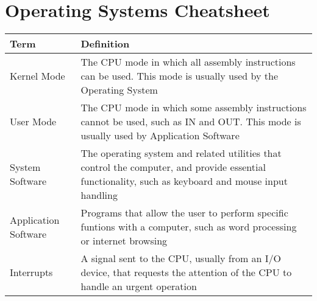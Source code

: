 \chapter{Operating Systems Cheatsheet}

\begin{center}
  \begin{tabular}{ |p{}|p{}| }
    \hline
    Term & Definition \\
    \hline
    Kernel Mode & The CPU mode in which all assembly instructions can be used. This mode is usually used by the Operating System \\
    User Mode & The CPU mode in which some assembly instructions cannot be used, such as IN and OUT. This mode is usually used by Application Software \\
    System Software & The operating system and related utilities that control the computer, and provide essential functionality, such as keyboard and mouse input handling \\
    Application Software & Programs that allow the user to perform specific funtions with a computer, such as word processing or internet browsing \\
    Interrupts & A signal sent to the CPU, usually from an I/O device, that requests the attention of the CPU to handle an urgent operation \\
    \hline
  \end{tabular}
\end{center}